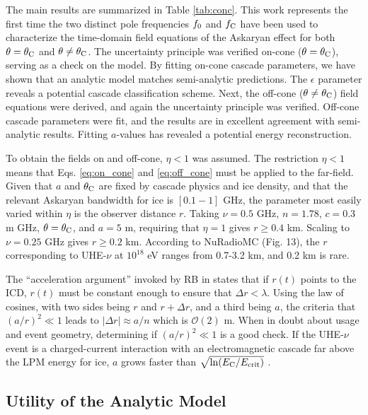 \documentclass[amsmath,amssymb,aps,prd,10pt,twocolumn]{revtex4}
\begin{document}
The main results are summarized in Table \ref{tab:conc}.  This work represents the first time the two distinct pole frequencies $f_{\rm 0}$ and $f_{\rm C}$ have been used to characterize the time-domain field equations of the Askaryan effect for both $\theta = \theta_{\rm C}$ and $\theta \neq \theta_{\rm C}$.  The uncertainty principle was verified on-cone ($\theta = \theta_{\rm C}$), serving as a check on the model.  By fitting on-cone cascade parameters, we have shown that an analytic model matches semi-analytic predictions.  The $\epsilon$ parameter reveals a potential cascade classification scheme.  Next, the off-cone ($\theta \neq \theta_{\rm C}$) field equations were derived, and again the uncertainty principle was verified.  Off-cone cascade parameters were fit, and the results are in excellent agreement with semi-analytic results.  Fitting $a$-values has revealed a potential energy reconstruction.

To obtain the fields on and off-cone, $\eta < 1$ was assumed.  The restriction $\eta < 1$ means that Eqs. \ref{eq:on_cone} and \ref{eq:off_cone} must be applied to the far-field.  Given that $a$ and $\theta_{\rm C}$ are fixed by cascade physics and ice density, and that the relevant Askaryan bandwidth for ice is $[0.1-1]$ GHz, the parameter most easily varied within $\eta$ is the observer distance $r$.  Taking $\nu = 0.5$ GHz, $n = 1.78$, $c = 0.3$ m GHz, $\theta = \theta_{\rm C}$, and $a = 5$ m, requiring that $\eta = 1$ gives $r \geq 0.4$ km.  Scaling to $\nu = 0.25$ GHz gives $r \geq 0.2$ km.  According to NuRadioMC \cite{10.1140/epjc/s10052-020-7612-8} (Fig. 13), the $r$ corresponding to UHE-$\nu$ at $10^{18}$ eV ranges from 0.7-3.2 km, and 0.2 km is rare.

The ``acceleration argument'' invoked by RB in \cite{10.1103/physrevd.65.016003} states that if $r(t)$ points to the ICD, $r(t)$ must be constant enough to ensure that $\Delta r < \lambda$.  Using the law of cosines, with two sides being $r$ and $r+\Delta r$, and a third being $a$, the criteria that $(a/r)^2 \ll 1$ leads to $|\Delta r| \approx a/n$ which is $\mathcal{O}(2)$ m.  When in doubt about usage and event geometry, determining if $(a/r)^2 \ll 1$ is a good check.  If the UHE-$\nu$ event is a charged-current interaction with an electromagnetic cascade far above the LPM energy for ice, $a$ grows faster than $\sqrt{\ln(E_{\rm C}/E_{\rm crit})}$ \cite{10.1103/physrevd.82.074017}.

\subsection{Utility of the Analytic Model}
\end{document}
